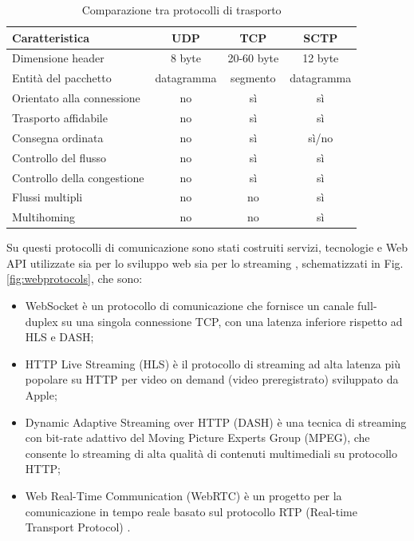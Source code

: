 \begin{table}[H]
	\centering
	\begin{tabular}{||l c c c||} 
		\hline
		Caratteristica & UDP & TCP & SCTP \\
		\hline\hline
		Dimensione header & 8 byte & 20-60 byte & 12 byte \\
		\hline
		Entità del pacchetto & datagramma & segmento & datagramma \\
		\hline
		Orientato alla connessione & no & sì & sì \\
		\hline
		Trasporto affidabile & no & sì & sì \\
		\hline
		Consegna ordinata & no & sì & sì/no \\
		\hline
		Controllo del flusso & no & sì & sì \\
		\hline
		Controllo della congestione & no & sì & sì \\
		\hline
		Flussi multipli & no & no & sì \\
		\hline
		Multihoming & no & no & sì \\
		\hline
	\end{tabular}

	\caption{Comparazione tra protocolli di trasporto}
	\label{table:TransportLayerComp}
\end{table}

Su questi protocolli di comunicazione sono stati costruiti servizi, tecnologie e Web API utilizzate sia per lo sviluppo web sia per lo streaming \parencite{Audio_and_video_delivery}, schematizzati in Fig. \ref{fig:webprotocols}, che sono:

\begin{itemize}
	\item WebSocket è un protocollo di comunicazione che fornisce un canale full-duplex su una singola connessione TCP, con una latenza inferiore rispetto ad HLS e DASH;
	\item HTTP Live Streaming (HLS) è il protocollo di streaming ad alta latenza più popolare su HTTP per video on demand (video preregistrato) sviluppato da Apple;
	\item Dynamic Adaptive Streaming over HTTP (DASH) è una tecnica di streaming con bit-rate adattivo del Moving Picture Experts Group (MPEG), che consente lo streaming di alta qualità di contenuti multimediali su protocollo HTTP;
	\item Web Real-Time Communication (WebRTC) è un progetto per la comunicazione in tempo reale basato sul protocollo RTP (Real-time Transport Protocol) \parencite{High_Performance_Browser_Networking}.
\end{itemize}

